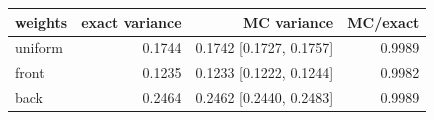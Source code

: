\begin{tabular}{lrrr}
\toprule
weights & exact variance & MC variance & MC/exact \\
\midrule
uniform & 0.1744 & 0.1742 [0.1727, 0.1757] & 0.9989 \\
front & 0.1235 & 0.1233 [0.1222, 0.1244] & 0.9982 \\
back & 0.2464 & 0.2462 [0.2440, 0.2483] & 0.9989 \\
\bottomrule
\end{tabular}
